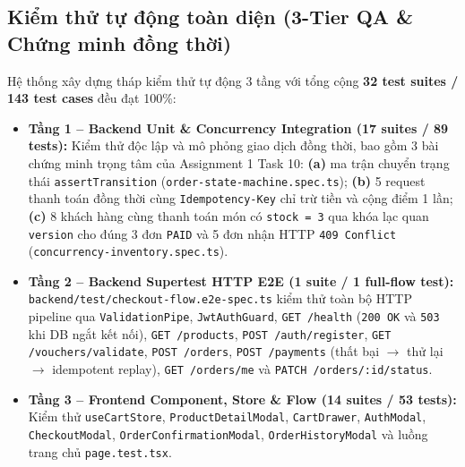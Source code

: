 \documentclass[a4paper,12pt]{article}
\begin{document}
\subsection{Kiểm thử tự động toàn diện (3-Tier QA \& Chứng minh đồng thời)}
Hệ thống xây dựng tháp kiểm thử tự động 3 tầng với tổng cộng \textbf{32 test suites / 143 test cases} đều đạt 100\%:
\begin{itemize}
  \item \textbf{Tầng 1 -- Backend Unit \& Concurrency Integration (17 suites / 89 tests):} Kiểm thử độc lập và mô phỏng giao dịch đồng thời, bao gồm 3 bài chứng minh trọng tâm của Assignment 1 Task 10: \textbf{(a)} ma trận chuyển trạng thái \texttt{assertTransition} (\texttt{order-state-machine.spec.ts}); \textbf{(b)} 5 request thanh toán đồng thời cùng \texttt{Idempotency-Key} chỉ trừ tiền và cộng điểm 1 lần; \textbf{(c)} 8 khách hàng cùng thanh toán món có \texttt{stock = 3} qua khóa lạc quan \texttt{version} cho đúng 3 đơn \texttt{PAID} và 5 đơn nhận HTTP \texttt{409 Conflict} (\texttt{concurrency-inventory.spec.ts}).
  \item \textbf{Tầng 2 -- Backend Supertest HTTP E2E (1 suite / 1 full-flow test):} \texttt{backend/test/checkout-flow.e2e-spec.ts} kiểm thử toàn bộ HTTP pipeline qua \texttt{ValidationPipe}, \texttt{JwtAuthGuard}, \texttt{GET /health} (\texttt{200 OK} và \texttt{503} khi DB ngắt kết nối), \texttt{GET /products}, \texttt{POST /auth/register}, \texttt{GET /vouchers/validate}, \texttt{POST /orders}, \texttt{POST /payments} (thất bại $\rightarrow$ thử lại $\rightarrow$ idempotent replay), \texttt{GET /orders/me} và \texttt{PATCH /orders/:id/status}.
  \item \textbf{Tầng 3 -- Frontend Component, Store \& Flow (14 suites / 53 tests):} Kiểm thử \texttt{useCartStore}, \texttt{ProductDetailModal}, \texttt{CartDrawer}, \texttt{AuthModal}, \texttt{CheckoutModal}, \texttt{OrderConfirmationModal}, \texttt{OrderHistoryModal} và luồng trang chủ \texttt{page.test.tsx}.
\end{itemize}
\end{document}
